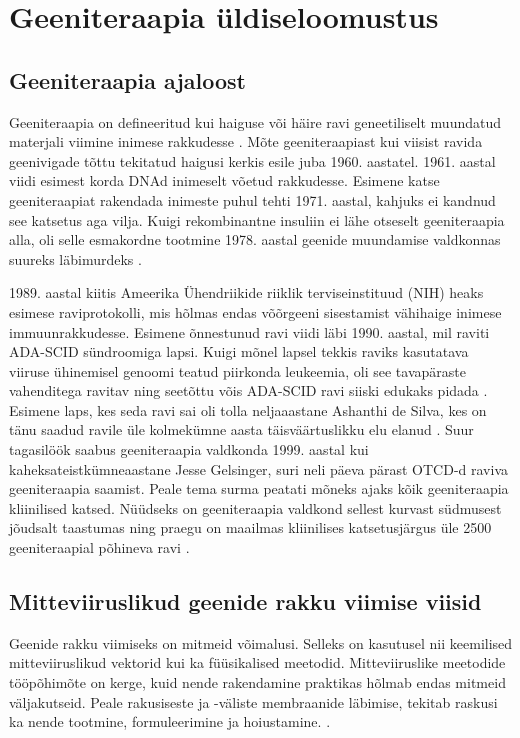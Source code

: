 \documentclass{trkut}%
\begin{document}
\section{Geeniteraapia üldiseloomustus}

\subsection{Geeniteraapia ajaloost}

Geeniteraapia on defineeritud kui haiguse või häire ravi geneetiliselt muundatud materjali viimine inimese rakkudesse \parencite{genter}. Mõte geeniteraapiast kui viisist ravida geenivigade tõttu tekitatud haigusi kerkis esile juba 1960. aastatel. 1961. aastal viidi esimest korda DNAd inimeselt võetud rakkudesse. Esimene katse geeniteraapiat rakendada inimeste puhul tehti 1971. aastal, kahjuks ei kandnud see katsetus aga vilja. \parencite{genajalugu} Kuigi rekombinantne insuliin ei lähe otseselt geeniteraapia alla, oli selle esmakordne tootmine 1978. aastal geenide muundamise valdkonnas suureks läbimurdeks \parencite{insuliin}. 

1989. aastal kiitis Ameerika Ühendriikide riiklik terviseinstituud (NIH) heaks esimese raviprotokolli, mis hõlmas endas võõrgeeni sisestamist vähihaige inimese immuunrakkudesse. Esimene õnnestunud ravi viidi läbi 1990. aastal, mil raviti ADA-SCID sündroomiga lapsi. \parencite{genter} Kuigi mõnel lapsel tekkis raviks kasutatava viiruse ühinemisel genoomi teatud piirkonda leukeemia, oli see tavapäraste vahenditega ravitav ning seetõttu võis ADA-SCID ravi siiski edukaks pidada \parencite{viirusvektoriteravi}. Esimene laps, kes seda ravi sai oli tolla neljaaastane Ashanthi de Silva, kes on tänu saadud ravile üle kolmekümne aasta täisväärtuslikku elu elanud \parencite{boston}. Suur tagasilöök saabus geeniteraapia valdkonda 1999. aastal kui kaheksateistkümneaastane Jesse Gelsinger, suri neli päeva pärast OTCD-d raviva geeniteraapia saamist. Peale tema surma peatati mõneks ajaks kõik geeniteraapia kliinilised katsed. \parencite{jesse} Nüüdseks on geeniteraapia valdkond sellest kurvast südmusest jõudsalt taastumas ning praegu on maailmas kliinilises katsetusjärgus üle 2500 geeniteraapial põhineva ravi \parencite{klin}. 

\subsection{Mitteviiruslikud geenide rakku viimise viisid}

Geenide rakku viimiseks on mitmeid võimalusi. Selleks on kasutusel nii keemilised mitteviiruslikud vektorid kui ka füüsikalised meetodid. Mitteviiruslike meetodide tööpõhimõte on kerge, kuid nende rakendamine praktikas hõlmab endas mitmeid väljakutseid. Peale rakusiseste ja -väliste membraanide läbimise, tekitab raskusi ka nende tootmine, formuleerimine ja hoiustamine. \parencite{genviisid}.
\end{document}
